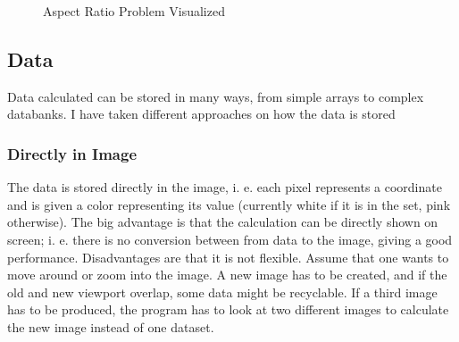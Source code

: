 \documentclass[10pt,a4paper,titlepage]{article}
\begin{document}
	\begin{figure}[h!]
		\centering
		\caption{Aspect Ratio Problem Visualized}
		\label{fig:aspect_ratio}
	\end{figure}
	\subsection{Data}
	Data calculated can be stored in many ways, from simple arrays to complex databanks. I have taken different approaches on how the data is stored
	\subsubsection{Directly in Image}
	The data is stored directly in the image, i. e. each pixel represents a coordinate and is given a color representing its value (currently white if it is in the set, pink otherwise). The big advantage is that the calculation can be directly shown on screen; i. e. there is no conversion between from data to the image, giving a good performance. Disadvantages are that it is not flexible. Assume that one wants to move around or zoom into the image. A new image has to be created, and if the old and new viewport overlap, some data might be recyclable. If a third image has to be produced, the program has to look at two different images to calculate the new image instead of one dataset.
\end{document}
